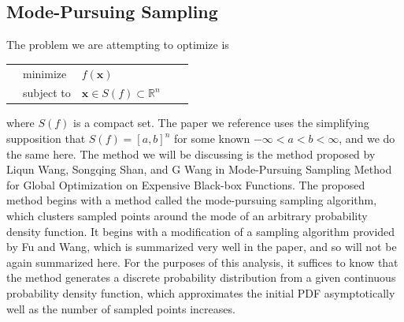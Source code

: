 \documentclass[10pt]{article}
\renewcommand{\vec}[1]{\mathbf{#1}}
\newcommand{\x}{\vec{x}}
\begin{document}
\subsection{Mode-Pursuing Sampling}
	The problem we are attempting to optimize is \\
	\begin{tabularx}{\textwidth}{X l l l X}
		& minimize		& $f(\x)$ & & \\
		& subject to	& $\x\in S(f)\subset\mathbb{R}^n$ & &
	\end{tabularx} 
	where $S(f)$ is a compact set. The paper we reference uses the simplifying supposition that $S(f) = [a,b]^n$ for some known $-\infty<a<b<\infty$, and we do the same here.
	The method we will be discussing is the method proposed by Liqun Wang, Songqing Shan, and G Wang in Mode-Pursuing Sampling Method for Global Optimization on Expensive Black-box Functions\cite{wang-mps}. The proposed method begins with a method called the mode-pursuing sampling algorithm, which clusters sampled points around the mode of an arbitrary probability density function. It begins with a modification of a sampling algorithm provided by Fu and Wang\cite{fu-sampling}, which is summarized very well in the paper, and so will not be again summarized here. For the purposes of this analysis, it suffices to know that the method generates a discrete probability distribution from a given continuous probability density function, which approximates the initial PDF asymptotically well as the number of sampled points increases. 
	
\end{document}
